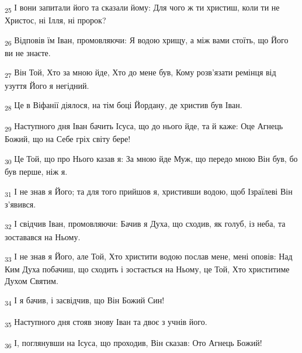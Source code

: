 \begin{tcolorbox}
\textsubscript{25} І вони запитали його та сказали йому: Для чого ж ти христиш, коли ти не Христос, ні Ілля, ні пророк?
\end{tcolorbox}
\begin{tcolorbox}
\textsubscript{26} Відповів їм Іван, промовляючи: Я водою хрищу, а між вами стоїть, що Його ви не знаєте.
\end{tcolorbox}
\begin{tcolorbox}
\textsubscript{27} Він Той, Хто за мною йде, Хто до мене був, Кому розв'язати ремінця від узуття Його я негідний.
\end{tcolorbox}
\begin{tcolorbox}
\textsubscript{28} Це в Віфанії діялося, на тім боці Йордану, де христив був Іван.
\end{tcolorbox}
\begin{tcolorbox}
\textsubscript{29} Наступного дня Іван бачить Ісуса, що до нього йде, та й каже: Оце Агнець Божий, що на Себе гріх світу бере!
\end{tcolorbox}
\begin{tcolorbox}
\textsubscript{30} Це Той, що про Нього казав я: За мною йде Муж, що передо мною Він був, бо був перше, ніж я.
\end{tcolorbox}
\begin{tcolorbox}
\textsubscript{31} І не знав я Його; та для того прийшов я, христивши водою, щоб Ізраїлеві Він з'явився.
\end{tcolorbox}
\begin{tcolorbox}
\textsubscript{32} І свідчив Іван, промовляючи: Бачив я Духа, що сходив, як голуб, із неба, та зоставався на Ньому.
\end{tcolorbox}
\begin{tcolorbox}
\textsubscript{33} І не знав я Його, але Той, Хто христити водою послав мене, мені оповів: Над Ким Духа побачиш, що сходить і зостається на Ньому, це Той, Хто христитиме Духом Святим.
\end{tcolorbox}
\begin{tcolorbox}
\textsubscript{34} І я бачив, і засвідчив, що Він Божий Син!
\end{tcolorbox}
\begin{tcolorbox}
\textsubscript{35} Наступного дня стояв знову Іван та двоє з учнів його.
\end{tcolorbox}
\begin{tcolorbox}
\textsubscript{36} І, поглянувши на Ісуса, що проходив, Він сказав: Ото Агнець Божий!
\end{tcolorbox}
